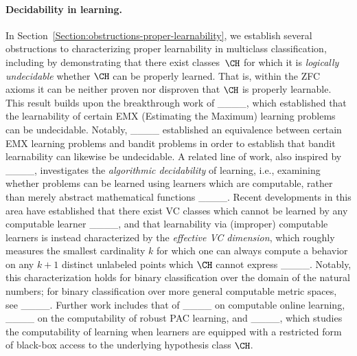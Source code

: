 \paragraph{Decidability in learning.} In Section~\ref{Section:obstructions-proper-learnability}, we establish several obstructions to characterizing proper learnability in multiclass classification, including by demonstrating that there exist classes~$\CH$ for which it is \emph{logically undecidable} whether $\CH$ can be properly learned. That is, within the ZFC axioms it can be neither proven nor disproven that $\CH$ is properly learnable. This result builds upon the breakthrough work of ____, which established that the learnability of certain EMX (Estimating the Maximum) learning problems can be undecidable. Notably, ____ established an equivalence between certain EMX learning problems and bandit problems in order to establish that bandit learnability can likewise be undecidable. 
A related line of work, also inspired by ____, investigates the \emph{algorithmic decidability} of learning, i.e., examining whether problems can be learned using learners which are computable, rather than merely abstract mathematical functions
____. Recent developments in this area have established that there exist VC classes which cannot be learned by any computable learner ____, and that learnability via (improper) computable learners is instead characterized by the \emph{effective VC dimension}, which roughly measures the smallest cardinality $k$ for which one can always compute a behavior on any $k + 1$ distinct unlabeled points which $\CH$ cannot express ____. Notably, this characterization holds for binary classification over the domain of the natural numbers; for binary classification over more general computable metric spaces, see ____. 
Further work includes that of ____ on computable online learning, ____ on the computability of robust PAC learning, and ____, which studies the computability of learning when learners are equipped with a restricted form of black-box access to the underlying hypothesis class $\CH$.